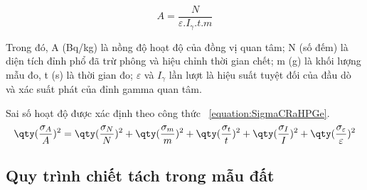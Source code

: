         \begin{equation}    
            A = \dfrac{N}{\varepsilon.I_\gamma.t.m}
            \label{equation:CRaHPGe}
        \end{equation}  

Trong đó, A (Bq/kg) là nồng độ hoạt độ của đồng vị quan tâm; N (số đếm) là diện tích đỉnh phổ đã trừ phông và hiệu chỉnh thời gian chết; m (g) là khối lượng mẫu đo, t (s) là thời gian đo; $\varepsilon$ và $I_\gamma$ lần lượt là hiệu suất tuyệt đối của đầu dò và xác suất phát của đỉnh gamma quan tâm.

    Sai số hoạt độ được xác định theo công thức ~\ref{equation:SigmaCRaHPGe}. 
        \begin{equation}
            \qty(\dfrac{\sigma_A}{A})^2 =  \qty(\dfrac{\sigma_N}{N})^2 + \qty(\dfrac{\sigma_m}{m})^2  + \qty(\dfrac{\sigma_t}{t})^2 + \qty(\dfrac{\sigma_I}{I})^2 + \qty(\dfrac{\sigma_\varepsilon}{\varepsilon})^2 
            \label{equation:SigmaCRaHPGe}
        \end{equation}

\subsection{ Quy trình chiết tách  trong mẫu đất}

